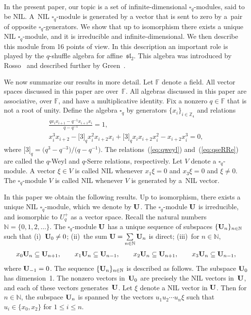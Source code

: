 \documentclass[pdftex]{sigma}
\numberwithin{equation}{section}
\begin{document}
In the present paper, our topic is a set of infinite-dimensional
 $\square_q$-modules, said to be NIL.
A~NIL $\square_q$-module is
generated by a vector that is sent to zero by a~pair of opposite $\square_q$-generators. We show that up to isomorphism
there exists a unique NIL
$\square_q$-module, and it is irreducible and infinite-dimensional.
We then describe this module from 16 points of view.
In this description an important role is played by
the $q$-shuffle algebra for affine~$\mathfrak{sl}_2$. This
algebra was introduced by
Rosso~\cite{rosso1} and described further by Green~\cite{green}.

We now summarize our results in more detail.
Let $\mathbb F$ denote a field.
All vector spaces discussed in this paper are over~$\mathbb F$.
All algebras discussed in this paper are associative, over $\mathbb F$, and
have a multiplicative identity.
Fix a nonzero $q \in \mathbb F$
that is not a root of unity.
Define the algebra
$\square_q$ by generators $\lbrace x_i \rbrace_{i \in \mathbb Z_4}$
and relations
\begin{gather}
\frac{q x_i x_{i+1}-q^{-1}x_{i+1}x_i}{q-q^{-1}} = 1,\label{eq:qweyl}\\
x^3_i x_{i+2} - \lbrack 3 \rbrack_q x^2_i x_{i+2} x_i +
\lbrack 3 \rbrack_q x_i x_{i+2} x^2_i -x_{i+2} x^3_i = 0,\label{eq:qseRRe}
\end{gather}
where $\lbrack 3 \rbrack_q = \big(q^3-q^{-3}\big)/\big(q-q^{-1}\big)$.
The relations~(\ref{eq:qweyl}) and~(\ref{eq:qseRRe}) are called the
$q$-Weyl
and
$q$-Serre
relations, respectively.
Let $V$ denote a $\square_q$-module. A vector $\xi\in V$ is called
 NIL whenever
 $x_1 \xi = 0 $ and $x_3 \xi=0$ and
 $\xi \not=0$.
The $\square_q$-module $V$ is called NIL whenever $V$ is generated by
a~NIL vector.

 In this paper we obtain the following results.
Up to isomorphism, there exists a unique NIL $\square_q$-module,
which we denote by $\bf U$. The
$\square_q$-module ${\bf U}$ is irreducible, and isomorphic to $U^+_q$ as a vector space.
Recall the natural numbers $\mathbb N = \lbrace 0,1,2,\ldots\rbrace$.
The $\square_q$-module ${\bf U}$
has a unique sequence of subspaces
$\lbrace {\bf U}_n \rbrace_{n \in \mathbb N}$
such that (i)~${\bf U}_0 \not=0$;
(ii)~the sum
 ${\bf U} = \sum\limits_{n \in \mathbb N} {\bf U}_n$ is direct;
(iii)~for
$n \in \mathbb N$,
\begin{gather*}
x_0 {\bf U}_n \subseteq {\bf U}_{n+1}, \qquad
x_1 {\bf U}_n \subseteq {\bf U}_{n-1}, \qquad
x_2 {\bf U}_n \subseteq {\bf U}_{n+1}, \qquad
x_3 {\bf U}_n \subseteq {\bf U}_{n-1},
\end{gather*}
where ${\bf U}_{-1}=0$.
The sequence
$\lbrace {\bf U}_n \rbrace_{n \in \mathbb N}$ is described as follows.
The subspace ${\bf U}_0$ has dimension~1.
The nonzero vectors in~${\bf U}_0$
are precisely the NIL vectors in~$\bf U$, and each of these vectors generates~$\bf U$.
Let $\xi$ denote a NIL vector in ${\bf U}$. Then
for $n \in \mathbb N$, the subspace
 ${\bf U}_n$ is spanned by
the vectors $u_1u_2\cdots u_n \xi$ such that
$u_i \in \lbrace x_0, x_2\rbrace$ for $1 \leq i \leq n$.
\end{document}
